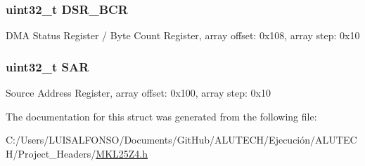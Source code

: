 \subsubsection[{D\+S\+R\+\_\+\+B\+C\+R}]{\setlength{\rightskip}{0pt plus 5cm}uint32\+\_\+t D\+S\+R\+\_\+\+B\+C\+R}\label{struct_d_m_a___mem_map_ae7642b2f08448a1bd463111a464f8e46}
D\+M\+A Status Register / Byte Count Register, array offset\+: 0x108, array step\+: 0x10 \hypertarget{struct_d_m_a___mem_map_a9f71dcd898faa75d4e2d1e8cace3882f}{}
\subsubsection[{S\+A\+R}]{\setlength{\rightskip}{0pt plus 5cm}uint32\+\_\+t S\+A\+R}\label{struct_d_m_a___mem_map_a9f71dcd898faa75d4e2d1e8cace3882f}
Source Address Register, array offset\+: 0x100, array step\+: 0x10 

The documentation for this struct was generated from the following file\+:\begin{DoxyCompactItemize}
\item 
C\+:/\+Users/\+L\+U\+I\+S\+A\+L\+F\+O\+N\+S\+O/\+Documents/\+Git\+Hub/\+A\+L\+U\+T\+E\+C\+H/\+Ejecución/\+A\+L\+U\+T\+E\+C\+H/\+Project\+\_\+\+Headers/\hyperlink{_m_k_l25_z4_8h}{M\+K\+L25\+Z4.\+h}\end{DoxyCompactItemize}
